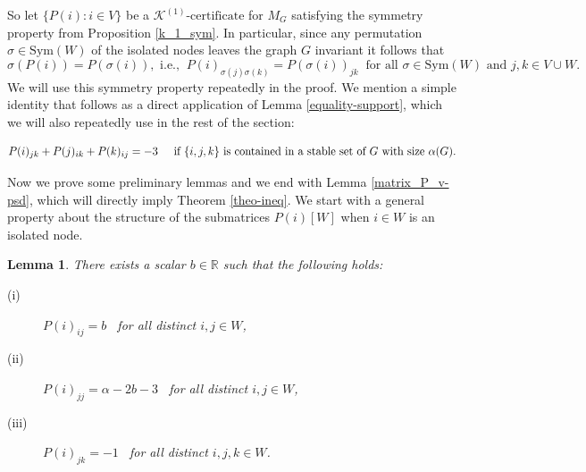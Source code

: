 \documentclass[11pt]{article}
\newtheorem{lemma}[theorem]{Lemma}
\newcommand{\konec}{\MK^{(1)}\text{-certificate}}
\numberwithin{equation}{section}
\newcommand{\MK}{{\mathcal K}}
\newcommand{\rrank}{\vartheta\text{\rm -rank}}
\begin{document}
So let $\{P(i): i\in V\}$ be a  $\konec$ for $M_G$ satisfying the symmetry property from Proposition \ref{k_1_sym}.   In particular, since any permutation $\sigma\in \text{Sym}(W)$ of the isolated nodes leaves the graph $G$ invariant it follows that
\begin{equation}\label{eqsym}
\sigma(P(i))=P(\sigma(i)), \text{ i.e., } \ P(i)_{\sigma(j)\sigma(k)}=P(\sigma(i))_{jk} \  \text{ for all } \sigma\in \text{Sym}(W) \text{ and } j,k \in V\cup W.
\end{equation}
We will use this symmetry property repeatedly in the proof.  We  mention a simple identity that follows as a direct application of Lemma \ref{equality-support}, which we will  also repeatedly use in the rest of the section:

 \begin{equation}\label{-3}
 P(i)_{jk} + P(j)_{ik} + P(k)_{ij} = -3 \hspace{.5cm} \text{if  $\{i,j,k\}$ is contained in a stable set of $G$ with size $\alpha(G).$}
 \end{equation}
 
 Now we prove some preliminary lemmas and we end with Lemma \ref{matrix_P_v-psd}, which will directly imply Theorem \ref{theo-ineq}. We start with a general property about the structure of the submatrices $P(i)[W]$ when  $i\in W$ is an isolated node.

\begin{lemma}\label{P[W]}
There exists a scalar $b\in \mathbb{R}$ such that  %
 the following holds:
\begin{description}
    \item [(i)] $P(i)_{ij}=b$ \ for all distinct $i,j\in W$, %
    \item  [(ii)] $P(i)_{jj}=\alpha-2b-3$ \ for all distinct $i,j\in W$, %
    \item [(iii)] $P(i)_{jk}=-1$ \ for all distinct $i,j,k\in W$. %
\end{description}
\end{lemma}
\end{document}
